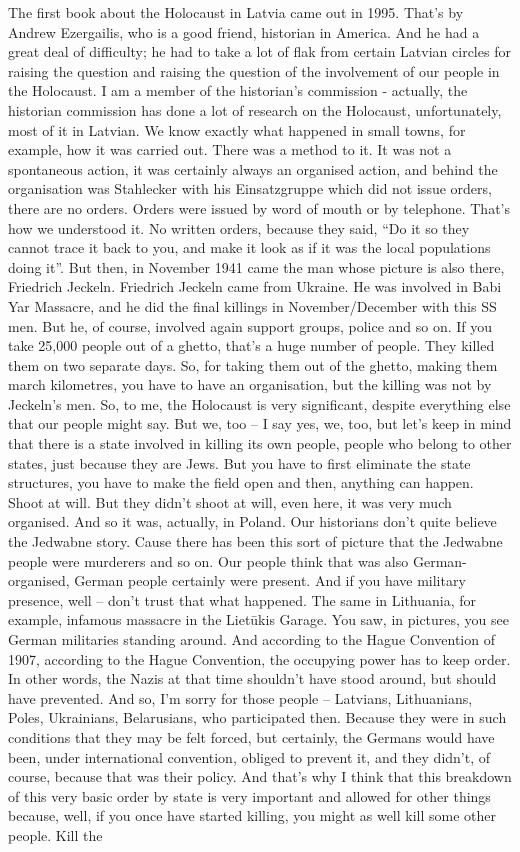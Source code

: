 The first book about the Holocaust in Latvia came out in 1995. That’s by Andrew Ezergailis, who is a good friend, historian in America. And he had a great deal of difficulty; he had to take a lot of flak from certain Latvian circles for raising the question and raising the question of the involvement of our people in the Holocaust. I am a member of the historian’s commission - actually, the historian commission has done a lot of research on the Holocaust, unfortunately, most of it in Latvian. We know exactly what happened in small towns, for example, how it was carried out. There was a method to it. It was not a spontaneous action, it was certainly always an organised action, and behind the organisation was Stahlecker with his Einsatzgruppe which did not issue orders, there are no orders. Orders were issued by word of mouth or by telephone. That’s how we understood it. No written orders, because they said, ``Do it so they cannot trace it back to you, and make it look as if it was the local populations doing it''. But then, in November 1941 came the man whose picture is also there, Friedrich Jeckeln. Friedrich Jeckeln came from Ukraine. He was involved in Babi Yar Massacre, and he did the final killings in November/December with this SS men. But he, of course, involved again support groups, police and so on. If you take 25,000 people out of a ghetto, that’s a huge number of people. They killed them on two separate days. So, for taking them out of the ghetto, making them march kilometres, you have to have an organisation, but the killing was not by Jeckeln’s men. So, to me, the Holocaust is very significant, despite everything else that our people might say. But we, too – I say yes, we, too, but let’s keep in mind that there is a state involved in killing its own people, people who belong to other states, just because they are Jews. But you have to first eliminate the state structures, you have to make the field open and then, anything can happen. Shoot at will. But they didn’t shoot at will, even here, it was very much organised. And so it was, actually, in Poland. Our historians don’t quite believe the Jedwabne story. Cause there has been this sort of picture that the Jedwabne people were murderers and so on. Our people think that was also German-organised, German people certainly were present. And if you have military presence, well – don’t trust that what happened. The same in Lithuania, for example, infamous massacre in the Lietūkis Garage. You saw, in pictures, you see German militaries standing around. And according to the Hague Convention of 1907, according to the Hague Convention, the occupying power has to keep order. In other words, the Nazis at that time shouldn’t have stood around, but should have prevented. And so, I’m sorry for those people – Latvians, Lithuanians, Poles, Ukrainians, Belarusians, who participated then. Because they were in such conditions that they may be felt forced, but certainly, the Germans would have been, under international convention, obliged to prevent it, and they didn’t, of course, because that was their policy. And that’s why I think that this breakdown of this very basic order by state is very important and allowed for other things because, well, if you once have started killing, you might as well kill some other people. Kill the 